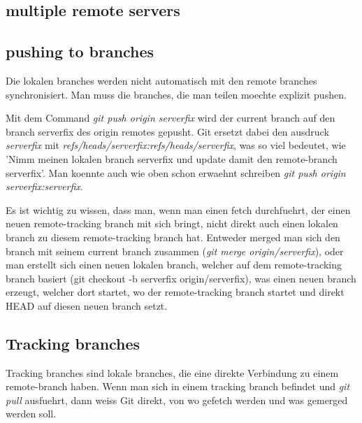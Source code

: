 \documentclass{article}
\begin{document}
\subsection*{multiple remote servers}

\subsection*{pushing to branches}
Die lokalen branches werden nicht automatisch mit den remote branches synchronisiert. Man muss die branches, die man teilen moechte explizit pushen.

Mit dem Command \textit{git push origin serverfix} wird der current branch auf den branch serverfix des origin remotes gepusht. Git ersetzt dabei den ausdruck \textit{serverfix} mit \textit{refs/heads/serverfix:refs/heads/serverfix}, was so viel bedeutet, wie 'Nimm meinen lokalen branch serverfix und update damit den remote-branch serverfix'. Man koennte auch wie oben schon erwaehnt schreiben \textit{git push origin serverfix:serverfix}.

Es ist wichtig zu wissen, dass man, wenn man einen fetch durchfuehrt, der einen neuen remote-tracking branch mit sich bringt, nicht direkt auch einen lokalen branch zu diesem remote-tracking branch hat. Entweder merged man sich den branch mit seinem current branch zusammen (\textit{git merge origin/serverfix}), oder man erstellt sich einen neuen lokalen branch, welcher auf dem remote-tracking branch basiert (git checkout -b serverfix origin/serverfix), was einen neuen branch erzeugt, welcher dort startet, wo der remote-tracking branch startet und direkt HEAD auf diesen neuen branch setzt.

\subsection*{Tracking branches}
Tracking branches sind lokale branches, die eine direkte Verbindung zu einem remote-branch haben. Wenn man sich in einem tracking branch befindet und \textit{git pull} ausfuehrt, dann weiss Git direkt, von wo gefetch werden und was gemerged werden soll.
\end{document}
